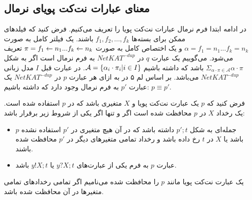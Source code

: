 \subsection{معنای عبارات نت‌کت پویای نرمال}
در ادامه ابتدا فرم نرمال عبارات نت‌کت پویا را تعریف می‌کنیم.
فرض کنید که فیلد‌های ممکن برای بسته‌ها
$f_1,f_2,...,f_k$
باشند.
یک فیلتر کامل%
به صورت
$\alpha = f_1 = n_1 ... f_k = n_k$
و یک اختصاص کامل%
به صورت
$\pi = f_1 \leftarrow n_1 ... f_k \leftarrow n_k$
تعریف می‌شود.
می‌گوییم یک عبارت
$q$
در
$NetKAT^{-dup}$
به فرم نرمال است
اگر به شکل
$\Sigma_{\alpha\cdot\pi \in \mathcal{A}}\alpha\cdot\pi$
باشد که داشته باشیم
$\mathcal{A} = \{\alpha_i\cdot\pi_i | i \in I\}$.
در عبارت قبل
$I$
مدل زبانی
$NetKAT^{-dup}$
می‌باشد.
بر اساس لم ۵ در
\cite{dynetkat}
به ازای هر عبارت
$p$
در
$NetKAT^{-dup}$
یک عبارت
$p'$
به فرم نرمال وجود دارد که داشته باشیم:
$p\equiv p'$.

\begin{definition}
    فرض کنید که
    $p$
    یک عبارت نت‌کت پویا و
    $X$
    متغیری باشد که در
    $p$
    استفاده شده است.
    یک رخداد
    $X$
    در
    $p$
    محافظت شده %
    است اگر و تنها اگر یکی از شروط زیر برقرار باشد:
    \begin{itemize}
        \item $p$
              جمله‌ای به شکل
              $p';t$
              داشته باشد که در آن
              هیچ متغیری در
              $p'$
              استفاده نشده باشد یا
              $X$
              در
              $t$
              رخ داده باشد و رخداد تمامی متغیر‌های دیگر در
              $p'$
              محافظت شده باشند.
        \item عبارت
              $p$
              به فرم یکی از عبارت‌های
              $y?X;t$
              یا
              $y!X;t$
              باشد.
    \end{itemize}
\end{definition}

\begin{definition}
    یک عبارت نت‌کت پویا مانند
    $p$
    را محافظت‌ شده%
    می‌نامیم اگر تمامی رخداد‌های تمامی متغیر‌ها در آن محافظت شده باشد.
\end{definition}

